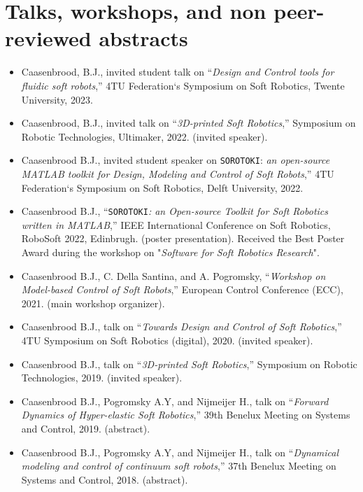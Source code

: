 \section*{Talks, workshops, and non peer-reviewed abstracts}
\begin{itemize}[leftmargin=2mm]
\item Caasenbrood, B.J., invited student talk on  “\textit{Design and Control tools for fluidic soft robots},” 4TU Federation`s Symposium on Soft Robotics, Twente University, 2023.
\item Caasenbrood, B.J., invited talk on “\textit{3D-printed Soft Robotics},” Symposium on Robotic Technologies, Ultimaker, 2022. (invited speaker).
\item Caasenbrood B.J., invited student speaker on \texttt{SOROTOKI}: \textit{an open-source MATLAB toolkit for Design, Modeling and Control of Soft Robots},”  4TU Federation`s Symposium on Soft Robotics, Delft University, 2022.
\item Caasenbrood B.J., “\texttt{SOROTOKI}\textit{: an Open-source Toolkit for Soft Robotics written in MATLAB},”  IEEE International Conference on Soft Robotics, RoboSoft 2022, Edinbrugh. (poster presentation). Received the Best Poster Award during the workshop on "\textit{Software for Soft Robotics Research}". 
\item Caasenbrood B.J., C. Della Santina, and A. Pogromsky, “\textit{Workshop on Model-based Control of Soft Robots},” European Control Conference (ECC), 2021. (main workshop organizer).
\item Caasenbrood B.J., talk on  “\textit{Towards Design and Control of Soft Robotics},” 4TU Symposium on Soft Robotics (digital), 2020. (invited speaker).
\item Caasenbrood B.J., talk on  “\textit{3D-printed Soft Robotics},” Symposium on Robotic Technologies, 2019. (invited speaker).
\item Caasenbrood B.J., Pogromsky A.Y, and Nijmeijer H., talk on  “\textit{Forward Dynamics of Hyper-elastic Soft Robotics},” 39th Benelux Meeting on Systems and Control, 2019. (abstract).
\item Caasenbrood B.J., Pogromsky A.Y, and Nijmeijer H., talk on  “\textit{Dynamical modeling and control of continuum soft robots},” 37th Benelux Meeting on Systems and Control, 2018. (abstract).
\end{itemize}
